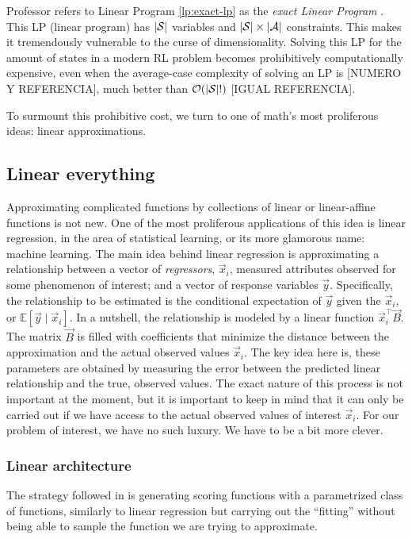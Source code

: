 Professor \citeauthor{farias2002thesis} refers to Linear Program
\eqref{lp:exact-lp} as the \textit{exact Linear Program}
\cite[Ch.~2.3]{farias2002thesis}. This LP (linear program) has $|\mathcal{S}|$
variables and $|\mathcal{S}| \times |\mathcal{A}|$ constraints. This makes it
tremendously vulnerable to the curse of dimensionality. Solving this LP for the
amount of states in a modern RL problem becomes prohibitively computationally
expensive, even when the average-case complexity of solving an LP is [NUMERO Y
REFERENCIA], much better than $\mathcal{O}(|\mathcal{S}|!)$ [IGUAL REFERENCIA].

To surmount this prohibitive cost, we turn to one of math's most proliferous
ideas: linear approximations.

\subsection{Linear everything}

Approximating complicated functions by collections of linear or linear-affine
functions is not new. One of the most proliferous applications of this idea is
linear regression, in the area of statistical learning, or its more glamorous
name: machine learning. The main idea behind linear regression is approximating
a relationship between a vector of \textit{regressors}, $\vec{x}_i$, measured
attributes observed for some phenomenon of interest; and a vector of response
variables $\vec{y}$. Specifically, the relationship to be estimated is the
conditional expectation of $\vec{y}$ given the $\vec{x}_i$, or $\mathbb{E} \left[ \vec{y}
\mid \vec{x}_i \right]$. In a nutshell, the relationship is modeled by a linear
function $\vec{x}_{i}^{\top} \vec{B}$. The matrix $\vec{B}$ is filled with
coefficients that minimize the distance between the approximation and the actual
observed values $\vec{x}_i$. The key idea here is, these parameters are obtained
by measuring the error between the predicted linear relationship and the true,
observed values. The exact nature of this process is not important at the
moment, but it is important to keep in mind that it can only be carried out if
we have access to the actual observed values of interest $\vec{x}_i$. For our
problem of interest, we have no such luxury. We have to be a bit more clever.

\subsubsection{Linear architecture}
The strategy followed in \cite{farias2002thesis} is generating scoring functions
with a pa\-ra\-me\-trized class of functions, similarly to linear regression but
carrying out the ``fitting'' without being able to sample the function we are
trying to approximate.


